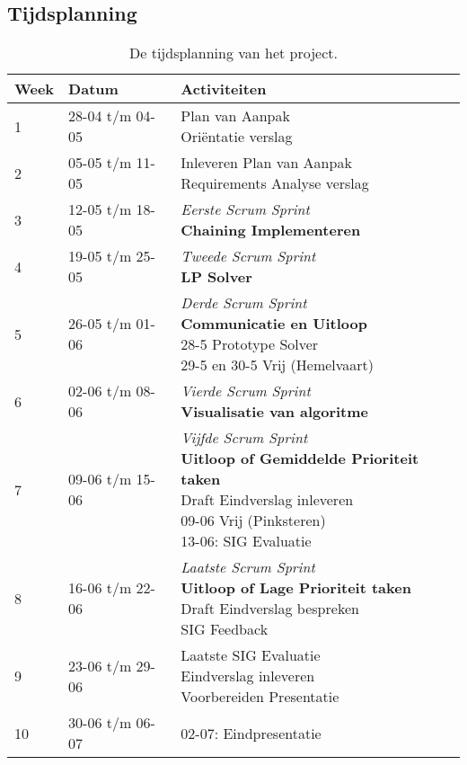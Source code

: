 \begin{appendices}
	\section{Tijdsplanning} \label{app:A}
	\begin{table}[!h]
	\def\arraystretch{1.5}
	\begin{tabularx}{\textwidth}{| p{1cm} | p{3cm}| X |}
	\hline
	\textbf{Week} & \textbf{Datum} & \textbf{Activiteiten} \\ \hline
	1 & 28-04 t/m 04-05 & \specialcell{Plan van Aanpak\\Ori\"entatie verslag}\\ \hline
	2 & 05-05 t/m 11-05 & \specialcell{Inleveren Plan van Aanpak\\Requirements Analyse verslag}\\ \hline
	3 & 12-05 t/m 18-05 & \specialcell{\textit{Eerste Scrum Sprint}\\\textbf{Chaining Implementeren}}\\ \hline
	4 & 19-05 t/m 25-05 & \specialcell{\textit{Tweede Scrum Sprint}\\\textbf{LP Solver}}\\ \hline
	5 & 26-05 t/m 01-06 & \specialcell{\textit{Derde Scrum Sprint}\\\textbf{Communicatie en Uitloop}\\28-5 Prototype Solver\\29-5 en 30-5 Vrij (Hemelvaart)}\\ \hline
	6 & 02-06 t/m 08-06 & \specialcell{\textit{Vierde Scrum Sprint}\\\textbf{Visualisatie van algoritme}}\\ \hline
	7 & 09-06 t/m 15-06 & \specialcell{\textit{Vijfde Scrum Sprint}\\\textbf{Uitloop of Gemiddelde Prioriteit taken}\\Draft Eindverslag inleveren\\09-06 Vrij (Pinksteren)\\13-06: SIG Evaluatie}\\ \hline
	8 & 16-06 t/m 22-06 & \specialcell{\textit{Laatste Scrum Sprint}\\\textbf{Uitloop of Lage Prioriteit taken}\\Draft Eindverslag bespreken\\SIG Feedback}\\ \hline
	9 & 23-06 t/m 29-06 & \specialcell{Laatste SIG Evaluatie\\Eindverslag inleveren\\Voorbereiden Presentatie}\\ \hline
	10 & 30-06 t/m 06-07 & 02-07: Eindpresentatie\\ \hline
	\end{tabularx}
	\caption{De tijdsplanning van het project.}
	\end{table}

\end{appendices}